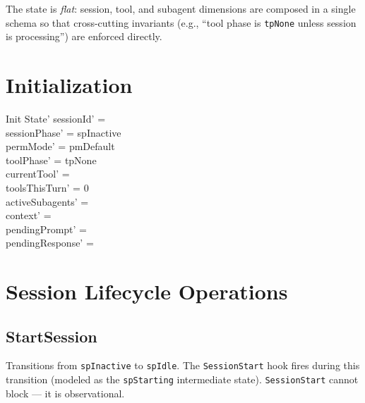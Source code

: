 \documentclass[a4paper,10pt,fleqn]{article}
\begin{document}
The state is \emph{flat}: session, tool, and subagent dimensions are
composed in a single schema so that cross-cutting invariants (e.g.,
``tool phase is \texttt{tpNone} unless session is processing'') are
enforced directly.

\section{Initialization}

\begin{schema}{Init}
  State'
  \where
  sessionId' = \emptyset \\
  sessionPhase' = spInactive \\
  permMode' = pmDefault \\
  toolPhase' = tpNone \\
  currentTool' = \emptyset \\
  toolsThisTurn' = 0 \\
  activeSubagents' = \emptyset \\
  context' = \langle \rangle \\
  pendingPrompt' = \emptyset \\
  pendingResponse' = \emptyset
\end{schema}

\section{Session Lifecycle Operations}

\subsection{StartSession}

Transitions from \texttt{spInactive} to \texttt{spIdle}. The
\texttt{SessionStart} hook fires during this transition (modeled
as the \texttt{spStarting} intermediate state). \texttt{SessionStart}
cannot block --- it is observational.
\end{document}
